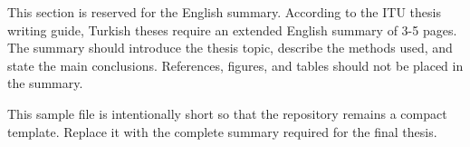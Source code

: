 This section is reserved for the English summary. According to the ITU thesis
writing guide, Turkish theses require an extended English summary of 3-5 pages.
The summary should introduce the thesis topic, describe the methods used, and
state the main conclusions. References, figures, and tables should not be placed
in the summary.

This sample file is intentionally short so that the repository remains a compact
template. Replace it with the complete summary required for the final thesis.
